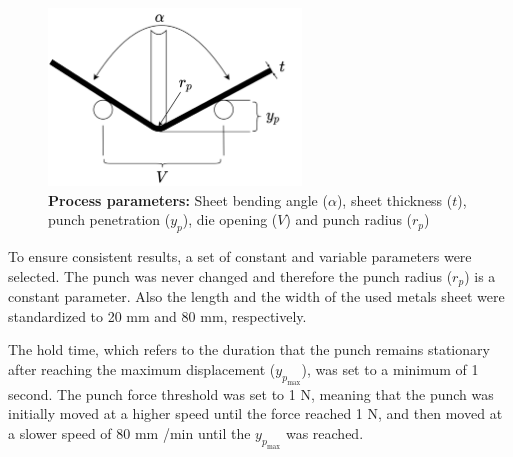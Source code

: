 \begin{figure}[h]
    \begin{tcolorbox}[arc=0pt,boxrule=0.5pt]
        \centering
        \includegraphics[trim=left botm right top, width=0.6\textwidth,
            clip]{chap4/images/process_parameters}
    \end{tcolorbox}
    \caption{\textbf{Process parameters:} Sheet bending angle ($\alpha$), sheet
    thickness ($t$), punch
    penetration ($y_p$), die opening ($V$) and punch radius ($r_p$)}
    \label{fig:process_parameters}
\end{figure}

To ensure consistent results, a set of constant and variable parameters were selected.
The punch was never changed and therefore the punch radius ($r_p$) is a constant parameter.
Also the length and the width of the used metals sheet were standardized to 20 mm and 80 mm, respectively.

The hold time, which refers to the duration that the punch remains stationary
after reaching the maximum displacement ($y_p_{\max}$), was set to a minimum of 1 second.
The punch force threshold was set to 1 N, meaning that the punch was initially moved at
a higher speed until the force reached 1 N, and then moved at a slower speed of 80 mm
/min until the $y_p_{\max}$ was reached.

